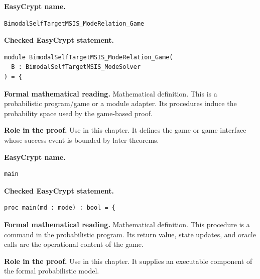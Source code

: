 \begin{formaldefinition}
\noindent\textbf{EasyCrypt name.}
\begin{lstlisting}[language=EasyCrypt,basicstyle=\ttfamily\scriptsize]
BimodalSelfTargetMSIS_ModeRelation_Game
\end{lstlisting}
\noindent\textbf{Checked EasyCrypt statement.}
\begin{lstlisting}[language=EasyCrypt,basicstyle=\ttfamily\scriptsize]
module BimodalSelfTargetMSIS_ModeRelation_Game(
  B : BimodalSelfTargetMSIS_ModeSolver
) = {
\end{lstlisting}
\noindent\textbf{Formal mathematical reading.}
Mathematical definition. This is a probabilistic program/game or a module adapter.  Its procedures induce the probability space used by the game-based proof.

\noindent\textbf{Role in the proof.}
Use in this chapter. It defines the game or game interface whose success event is bounded by later theorems.

\end{formaldefinition}

\begin{formaldefinition}
\noindent\textbf{EasyCrypt name.}
\begin{lstlisting}[language=EasyCrypt,basicstyle=\ttfamily\scriptsize]
main
\end{lstlisting}
\noindent\textbf{Checked EasyCrypt statement.}
\begin{lstlisting}[language=EasyCrypt,basicstyle=\ttfamily\scriptsize]
proc main(md : mode) : bool = {
\end{lstlisting}
\noindent\textbf{Formal mathematical reading.}
Mathematical definition. This procedure is a command in the probabilistic program.  Its return value, state updates, and oracle calls are the operational content of the game.

\noindent\textbf{Role in the proof.}
Use in this chapter. It supplies an executable component of the formal probabilistic model.

\end{formaldefinition}

